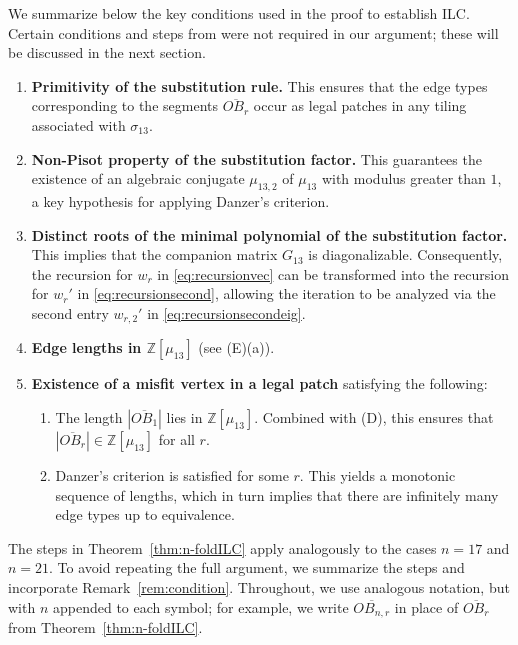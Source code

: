 \begin{rem}
\label{rem:condition}
We summarize below the key conditions used in the proof to establish ILC. 
Certain conditions and steps from \cite{Danz02} were not required in our argument; these will be discussed in the next section.

\begin{enumerate}
\item[(A)] \textbf{Primitivity of the substitution rule.}  
This ensures that the edge types corresponding to the segments $\overline{OB_r}$ occur as legal patches in any tiling associated with $\sigma_{13}$.

\item[(B)] \textbf{Non-Pisot property of the substitution factor.}  
This guarantees the existence of an algebraic conjugate $\mu_{13,2}$ of $\mu_{13}$ with modulus greater than $1$, a key hypothesis for applying Danzer’s criterion.

\item[(C)] \textbf{Distinct roots of the minimal polynomial of the substitution factor.}  
This implies that the companion matrix $G_{13}$ is diagonalizable. Consequently, the recursion for $w_r$ in \eqref{eq:recursionvec} can be transformed into the recursion for $w_r'$ in \eqref{eq:recursionsecond}, allowing the iteration to be analyzed via the second entry $w_{r,2}'$ in \eqref{eq:recursionsecondeig}.

\item[(D)] \textbf{Edge lengths in $\mathbb{Z}[\mu_{13}]$}  (see (E)(a)).

\item[(E)] \textbf{Existence of a misfit vertex in a legal patch} satisfying the following:
\begin{enumerate}
\item[(a)] The length $|\overline{OB_1}|$ lies in $\mathbb{Z}[\mu_{13}]$. Combined with (D), this ensures that $|\overline{OB_r}| \in \mathbb{Z}[\mu_{13}]$ for all $r$.
\item[(b)] Danzer’s criterion is satisfied for some $r$. This yields a monotonic sequence of lengths, which in turn implies that there are infinitely many edge types up to equivalence.
\end{enumerate}
\end{enumerate}
\end{rem}

The steps in Theorem~\ref{thm:n-foldILC} apply analogously to the cases \(n = 17\) and \(n = 21\). To avoid repeating the full argument, we summarize the steps and incorporate Remark~\ref{rem:condition}. Throughout, we use analogous notation, but with \(n\) appended to each symbol; for example, we write \(\overline{OB_{n,r}}\) in place of \(\overline{OB_{r}}\) from Theorem~\ref{thm:n-foldILC}.

